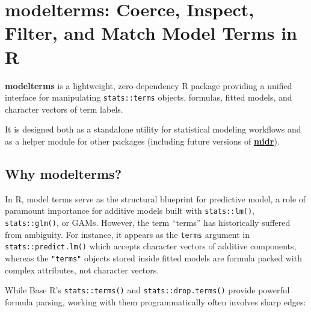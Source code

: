 \documentclass[
]{article}
\author{}
\date{\vspace{-2.5em}}
\makeatletter
\newcommand*\pandocbounded[1]{%
  \sbox\pandoc@box{#1}%
  \Gscale@div\@tempa{\textheight}{\dimexpr\ht\pandoc@box+\dp\pandoc@box\relax}%
  \Gscale@div\@tempb{\linewidth}{\wd\pandoc@box}%
  \ifdim\@tempb\p@<\@tempa\p@\let\@tempa\@tempb\fi%
  \ifdim\@tempa\p@<\p@\scalebox{\@tempa}{\usebox\pandoc@box}%
  \else\usebox{\pandoc@box}%
  \fi%
}
\makeatother
\begin{document}
\section{modelterms: Coerce, Inspect, Filter, and Match Model Terms in
R}\label{modelterms-coerce-inspect-filter-and-match-model-terms-in-r}

\href{https://lifecycle.r-lib.org/articles/stages.html\#experimental}{\pandocbounded{}}

\textbf{modelterms} is a lightweight, zero-dependency R package
providing a unified interface for manipulating \texttt{stats::terms}
objects, formulas, fitted models, and character vectors of term labels.

It is designed both as a standalone utility for statistical modeling
workflows and as a helper module for other packages (including future
versions of \href{https://github.com/ryo-asashiba/midr}{\textbf{midr}}).

\subsection{\texorpdfstring{Why
\textbf{modelterms}?}{Why modelterms?}}\label{why-modelterms}

In R, model terms serve as the structural blueprint for predictive
model, a role of paramount importance for additive models built with
\texttt{stats::lm()}, \texttt{stats::glm()}, or GAMs. However, the term
``terms'' has historically suffered from ambiguity. For instance, it
appears as the \texttt{terms} argument in \texttt{stats::predict.lm()}
which accepts character vectors of additive components, whereas the
\texttt{"terms"} objects stored inside fitted models are formula packed
with complex attributes, not character vectors.

While Base R's \texttt{stats::terms()} and \texttt{stats::drop.terms()}
provide powerful formula parsing, working with them programmatically
often involves sharp edges:
\end{document}
